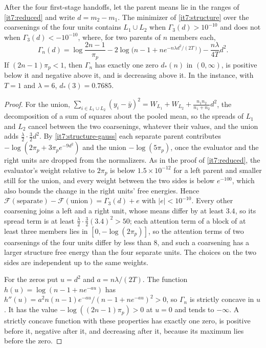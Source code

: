 \documentclass[11pt,letterpaper]{report}
\begin{document}
After the four first-stage handoffs, let the parent means lie in the ranges of \cref{it7:reduced} and write $d=m_2-m_1$. The minimizer of \cref{it7:structure} over the coarsenings of the four units contains $L_1\cup L_2$ when $\Gamma_3(d)>10^{-10}$ and does not when $\Gamma_3(d)<-10^{-10}$, where, for two parents of $n$ members each,
\begin{equation}
\Gamma_n(d)=\log\frac{2n-1}{\pi_p}-2\log\bigl(n-1+ne^{-n\lambda d^2/(2T)}\bigr)-\frac{n\lambda}{4T}d^2.
\label{it7:radius-fn}
\end{equation}
If $(2n-1)\pi_p<1$, then $\Gamma_n$ has exactly one zero $d_*(n)$ in $(0,\infty)$, is positive below it and negative above it, and is decreasing above it. In the instance, with $T=1$ and $\lambda=6$, $d_*(3)=0.7685$.
\begin{proof}
For the union, $\sum_{i\in L_1\cup L_2}(y_i-\bar y)^2=W_{L_1}+W_{L_2}+\frac{n_1n_2}{n_1+n_2}d^2$, the decomposition of a sum of squares about the pooled mean, so the spreads of $L_1$ and $L_2$ cancel between the two coarsenings, whatever their values, and the union adds $\frac\lambda2\cdot\frac32d^2$. By \cref{it7:structure-gauss} each separate parent contributes $-\log(2\pi_p+3\pi_pe^{-9d^2})$ and the union $-\log(5\pi_p)$, once the evaluator and the right units are dropped from the normalizers. As in the proof of \cref{it7:reduced}, the evaluator's weight relative to $2\pi_p$ is below $1.5\times10^{-12}$ for a left parent and smaller still for the union, and every weight between the two sides is below $e^{-100}$, which also bounds the change in the right units' free energies. Hence $\mathcal F(\text{separate})-\mathcal F(\text{union})=\Gamma_3(d)+e$ with $|e|<10^{-10}$. Every other coarsening joins a left and a right unit, whose means differ by at least $3.4$, so its spread term is at least $\frac\lambda2\cdot\frac32(3.4)^2>50$; each attention term of a block of at least three members lies in $[0,-\log(2\pi_p)]$, so the attention terms of two coarsenings of the four units differ by less than $8$, and such a coarsening has a larger structure free energy than the four separate units. The choices on the two sides are independent up to the same weights.

For the zeros put $u=d^2$ and $a=n\lambda/(2T)$. The function $h(u)=\log(n-1+ne^{-au})$ has $h''(u)=a^2n(n-1)e^{-au}/(n-1+ne^{-au})^2>0$, so $\Gamma_n$ is strictly concave in $u$. It has the value $-\log((2n-1)\pi_p)>0$ at $u=0$ and tends to $-\infty$. A strictly concave function with these properties has exactly one zero, is positive before it, negative after it, and decreasing after it, because its maximum lies before the zero.
\end{proof}
\end{document}
